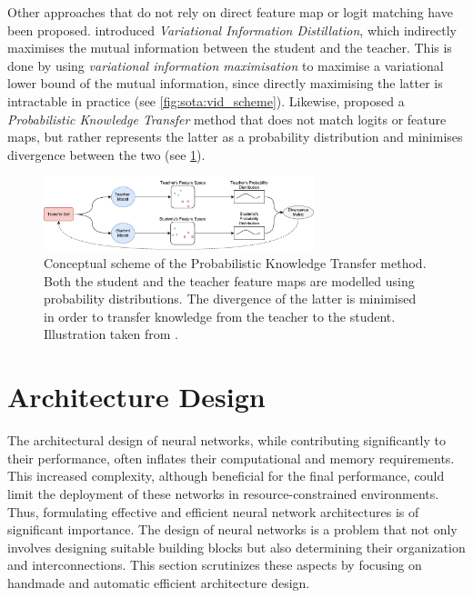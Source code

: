 Other approaches that do not rely on direct feature map or logit matching have
been proposed. \cite{DBLP:conf/cvpr/AhnHDLD19} introduced \emph{Variational
Information Distillation}, which indirectly maximises the mutual information
between the student and the teacher. This is done by using \emph{variational
information maximisation} \cite{barber2004algorithm} to maximise a variational
lower bound of the mutual information, since directly maximising the latter is
intractable in practice (see \cref{fig:sota:vid_scheme}). Likewise,
\cite{DBLP:conf/eccv/PassalisT18} proposed a \emph{Probabilistic Knowledge Transfer}
method that does not match logits or feature maps, but rather represents the
latter as a probability distribution and minimises divergence between the two
(see \cref{fig:sota:pkt_scheme}).\\


\begin{figure}[htbp]
    \centering
    \includegraphics[width=0.7\textwidth]{chapter_sota/assets/pkt_diagram.pdf}
    \caption{Conceptual scheme of the
    Probabilistic Knowledge Transfer method. Both the student and the teacher
    feature maps are modelled using probability distributions. The divergence of the
    latter is minimised in order to transfer knowledge from the teacher to the
    student. Illustration taken from \cite{DBLP:conf/eccv/PassalisT18}.}
    \label{fig:sota:pkt_scheme}
\end{figure}

\section{Architecture Design}\label{sec:sota:archi_design}

The architectural design of neural networks, while contributing significantly to
their performance, often inflates their computational and memory requirements.
This increased complexity, although beneficial for the final performance, could
limit the deployment of these networks in resource-constrained environments.
Thus, formulating effective and efficient neural network architectures is of
significant importance. The design of neural networks is a problem that not only
involves designing suitable building blocks but also determining their
organization and interconnections. This section scrutinizes these aspects by
focusing on handmade and automatic efficient architecture design.\\

